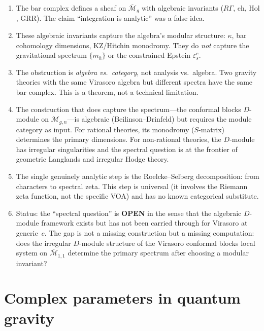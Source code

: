 \documentclass[11pt]{article}
\newcommand{\cM}{\mathcal{M}}
\begin{document}
\begin{enumerate}[label=(\alph*)]
\item The bar complex defines a sheaf on $\overline{\cM}_g$
  with algebraic invariants ($R\Gamma$, $\mathrm{ch}$,
  $\mathrm{Hol}$, GRR).  The claim ``integration is analytic''
  was a false idea.

\item These algebraic invariants capture the algebra's modular
  structure: $\kappa$, bar cohomology dimensions, KZ/Hitchin
  monodromy.  They do \emph{not} capture the gravitational
  spectrum $\{m_h\}$ or the constrained Epstein
  $\varepsilon^c_s$.

\item The obstruction is \emph{algebra vs.\ category},
  not analysis vs.\ algebra.  Two gravity theories with the
  same Virasoro algebra but different spectra have the same
  bar complex.  This is a theorem, not a technical limitation.

\item The construction that does capture the spectrum---the
  conformal blocks $D$-module on $\cM_{g,n}$---is algebraic
  (Beilinson--Drinfeld) but requires the module category
  as input.  For rational theories, its monodromy ($S$-matrix)
  determines the primary dimensions.  For non-rational theories,
  the $D$-module has irregular singularities and the spectral
  question is at the frontier of geometric Langlands and
  irregular Hodge theory.

\item The single genuinely analytic step is the
  Roelcke--Selberg decomposition: from characters to spectral
  zeta.  This step is universal (it involves the Riemann
  zeta function, not the specific VOA) and has no known
  categorical substitute.

\item Status: the ``spectral question'' is \textbf{OPEN} in the
  sense that the algebraic $D$-module framework exists but
  has not been carried through for Virasoro at generic~$c$.
  The gap is not a missing construction but a missing
  computation: does the irregular $D$-module structure of the
  Virasoro conformal blocks local system on
  $\overline{\cM}_{1,1}$ determine the primary spectrum after
  choosing a modular invariant?
\end{enumerate}


\section{Complex parameters in quantum gravity}
\label{sec:complex-parameters-qg}
\end{document}
